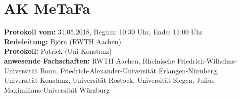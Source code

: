 
\section{AK MeTaFa}

	\textbf{Protokoll vom:} 31.05.2018,
	Beginn: 10:30 Uhr,
	Ende: 11:00 Uhr \\
	\textbf{Redeleitung:} Björn (RWTH Aachen) \\
	\textbf{Protokoll:} Patrick (Uni Konstanz) \\
	\textbf{anwesende Fachschaften:} RWTH Aachen, Rheinische Friedrich-Wilhelms-Universität Bonn, Friedrich-Alexander-Universität Erlangen-Nürnberg, Universität Konstanz, Universität Rostock, Universität Siegen, Julius-Maximilians-Universität Würzburg


